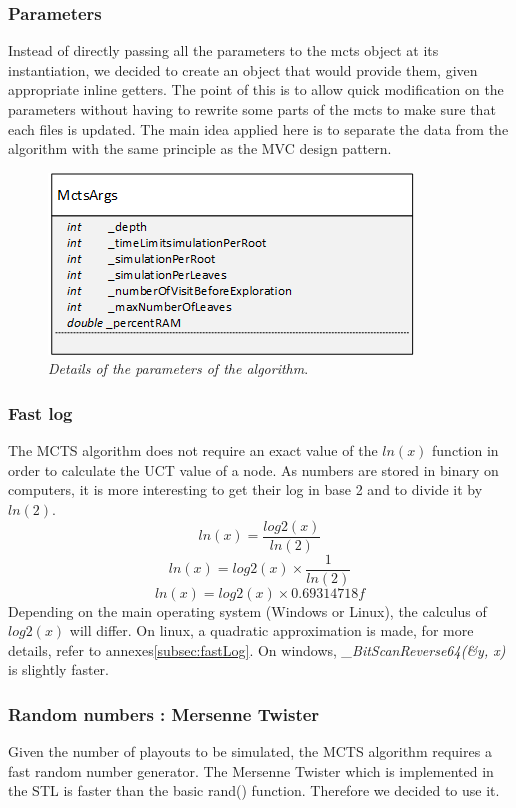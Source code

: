 \subsubsection{Parameters}
Instead of directly passing all the parameters to the mcts object at its instantiation, we decided to create an object that would provide them, given appropriate inline getters. The point of this is to allow quick modification on the parameters without having to rewrite some parts of the mcts to make sure that each files is updated. The main idea applied here is to separate the data from the algorithm with the same principle as the MVC design pattern.
\begin{figure}[H] 
\centerline{\includegraphics[scale=0.8]{Data_Structure/Img/MctsArgs.png}}
\caption{\label{fig:mctsargsuml}\textit{Details of the parameters of the algorithm}.}
\end{figure}

\subsubsection{Fast log}
The MCTS algorithm does not require an exact value of the \ensuremath{ln(x)} function in order to calculate the UCT value of a node. As numbers are stored in binary on computers, it is more interesting to get their log in base 2 and to divide it by \ensuremath{ln(2)}. 
\begin{equation}
ln(x) = \frac{log2(x)}{ln(2)}
\end{equation}
\begin{equation}
ln(x) = log2(x) \times \frac{1}{ln(2)}
\end{equation}
\begin{equation}
ln(x) = log2(x) \times 0.69314718f
\end{equation}
Depending on the main operating system (Windows or Linux), the calculus of \ensuremath{log2(x)} will differ. On linux, a quadratic approximation is made, for more details, refer to annexes\ref{subsec:fastLog}. On windows, \textit{\_BitScanReverse64(\&y, x)} is slightly faster. 

\subsubsection{Random numbers : Mersenne Twister}
Given the number of playouts to be simulated, the MCTS algorithm requires a fast random number generator. The Mersenne Twister which is implemented in the STL is faster than the basic rand() function. Therefore we decided to use it.



